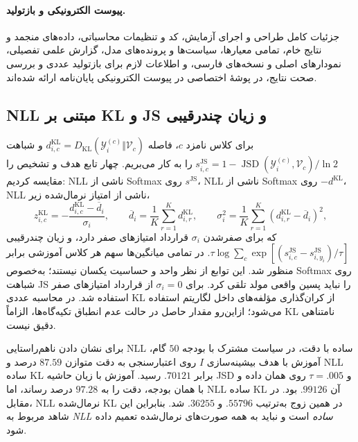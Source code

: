 \paragraph{پیوست الکترونیکی و بازتولید.}
جزئیات کامل طراحی و اجرای آزمایش، کد و تنظیمات محاسباتی،
داده‌های منجمد و نتایج خام، تمامی معیارها، سیاست‌ها و
پرونده‌های مدل، گزارش علمی تفصیلی، نمودارهای اصلی و
نسخه‌های فارسی، و اطلاعات لازم برای بازتولید عددی
و بررسی صحت نتایج، در پوشهٔ اختصاصی
در پیوست الکترونیکی پایان‌نامه ارائه شده‌اند.

\subsection{NLL مبتنی بر KL و JS و زیان چندرقیبی}
\label{subsec:ch4-v1-new-objective-comparison}
برای کلاس نامزد $c$، فاصله
$d_{i,c}^{\mathrm{KL}}=
D_{\mathrm{KL}}(\mathscr Y_i^{(c)}\Vert\mathcal V_c)$
و شباهت
$s_{i,c}^{\mathrm{JS}}=
1-\operatorname{JSD}(\mathscr Y_i^{(c)},\mathcal V_c)/\ln2$
را به کار می‌بریم. چهار تابع هدف و تشخیص را مقایسه کردیم:
NLL ناشی از Softmax روی $s^{\mathrm{JS}}$،
NLL ناشی از Softmax روی $-d^{\mathrm{KL}}$،
NLL ناشی از امتیاز نرمال‌شده زیر،
\begin{equation}\label{eq:ch4-v1-normalized-KL-score}
z^{\mathrm{KL}}_{i,c}
=-\frac{d^{\mathrm{KL}}_{i,c}-\overline d_i}{\sigma_i},
\qquad
\overline d_i=\frac1K\sum_{r=1}^K d^{\mathrm{KL}}_{i,r},
\qquad
\sigma_i^2=\frac1K\sum_{r=1}^K
(d^{\mathrm{KL}}_{i,r}-\overline d_i)^2,
\end{equation}
که برای صفرشدن $\sigma_i$ قرارداد امتیازهای صفر دارد،
و زیان چندرقیبی
$\tau\log\sum_c\exp[(s_{i,c}^{\mathrm{JS}}-
s_{i,y_i}^{\mathrm{JS}})/\tau]$.
در تمامی میانگین‌ها سهم هر کلاس آموزشی برابر منظور شد.
این توابع از نظر واحد و حساسیت یکسان نیستند؛ به‌خصوص
Softmax روی شباهت JS را نباید پسین واقعی مولد تلقی کرد.
برای $\sigma_i=0$ از قرارداد امتیازهای صفر استفاده شد.
در محاسبه عددی KL از کران‌گذاری مؤلفه‌های داخل لگاریتم
استفاده می‌شود؛ ازاین‌رو مقدار حاصل در حالت عدم انطباق
تکیه‌گاه‌ها، الزاماً KL نامتناهی دقیق نیست.

برای نشان دادن ناهم‌راستایی NLL ساده با دقت، در سیاست مشترک
با بودجه $50$ گام، آموزش با هدف بیشینه‌سازی $I$ روی
اعتبارسنجی به دقت متوازن $87.59$ درصد و
NLL ساده KL برابر $.70121$ رسید. آموزش با زیان
حاشیه JSD و $\tau=.005$ روی همان داده و با همان
بودجه، دقت را به $97.28$ درصد رساند، اما
NLL ساده KL آن $.99126$ بود. در مقابل،
NLL نرمال‌شده KL در همین زوج به‌ترتیب $.55796$ و
$.36255$ شد. بنابراین این شاهد مربوط به
\emph{NLL ساده} است و نباید به همه صورت‌های
نرمال‌شده تعمیم داده شود.

